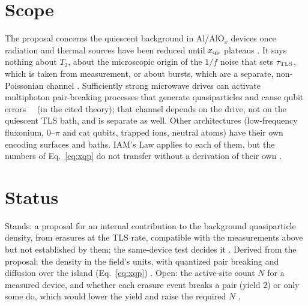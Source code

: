 \section{Scope}
The proposal concerns the quiescent background in Al/AlO$_x$ devices once radiation and thermal sources have been reduced until
$x_{\rm qp}$ plateaus \interp. It says nothing about $T_2$, about the microscopic origin of the $1/f$ noise that sets $\tau_{\rm TLS}$,
which is taken from measurement, or about bursts, which are a separate, non-Poissonian channel \interp. Sufficiently strong microwave drives can
activate multiphoton pair-breaking processes that generate quasiparticles and cause qubit errors~\cite{Chowdhury2026} \derived\ (in the cited theory); that channel
depends on the drive, not on the quiescent TLS bath, and is separate as well. Other architectures (low-frequency fluxonium, $0$--$\pi$
and cat qubits, trapped ions, neutral atoms) have their own encoding surfaces and baths. IAM's Law applies to each of them, but the
numbers of Eq.~\eqref{eq:xqp} do not transfer without a derivation of their own \interp.

\section{Status}
Stands: a proposal for an internal contribution to the background quasiparticle density, from erasures at the TLS rate, compatible with the measurements
above but not established by them; the same-device test decides it \conjecture. Derived from the proposal: the density in the field's units, with quantized pair breaking
and diffusion over the island (Eq.~\eqref{eq:xqp}) \derived. Open: the active-site count $N$ for a measured device, and whether each erasure event breaks a
pair (yield $2$) or only some do, which would lower the yield and raise the required $N$ \openprob.
